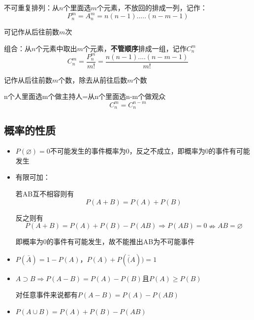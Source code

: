\documentclass{ctexart}
\begin{document}
        不可重复排列：从$n$个里面选$m$个元素，不放回的排成一列，记作：
        \begin{equation}
            P_n^m = A_n^m=n(n-1).....(n-m-1)
        \end{equation}

        可记作从后往前数$m$次

        组合：从$n$个元素中取出$m$个元素，\textbf{不管顺序}排成一组，记作$C_n^m$
        \begin{equation}
            C_n^m=\frac{P_n^m}{m!}=\frac{n(n-1)....(n-m-1)}{m!}
        \end{equation}

        记作从后往前数$m$个数，除去从前往后数$m$个数

        n个人里面选m个做主持人=从n个里面选n-m个做观众
        \begin{equation}
            C_n^m=C_n^{n-m}
        \end{equation}
    \subsection{概率的性质}
        \begin{itemize}
            \item[1)] $P(\varnothing )=0$不可能发生的事件概率为0，反之不成立，即概率为0的事件有可能发生
            \item[2)] 有限可加：
            
            若AB互不相容则有
            \begin{equation}
                P(A+B)=P(A)+P(B)
            \end{equation}

            反之则有
            \begin{equation}
                P(A+B)=P(A)+P(B)-P(AB)\Rightarrow P(AB)=0\nRightarrow AB=\varnothing
            \end{equation}

            即概率为0的事件有可能发生，故不能推出AB为不可能事件

            \item[3)] $P(\bar{A})=1-P(A)$，$P(A)+P(\bar(A))=1$
            \item[4)] $A\supset B\Rightarrow P(A-B)=P(A)-P(B)$且$P(A)\geqslant P(B)$
            
            对任意事件来说都有$P(A-B)=P(A)-P(AB)$
            \item[5)] $P(A\cup B)=P(A)+P(B)-P(AB)$
        \end{itemize}
\end{document}
